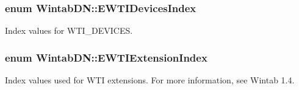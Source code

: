 \hypertarget{namespace_wintab_d_n_a87e63128e31d86cb418e895f3d58565c}{
\subsubsection[{EWTIDevicesIndex}]{\setlength{\rightskip}{0pt plus 5cm}enum {\bf WintabDN::EWTIDevicesIndex}}}
\label{namespace_wintab_d_n_a87e63128e31d86cb418e895f3d58565c}


Index values for WTI\_\-DEVICES. 

\hypertarget{namespace_wintab_d_n_a52875c234488913934e0d49ac13c438d}{
\subsubsection[{EWTIExtensionIndex}]{\setlength{\rightskip}{0pt plus 5cm}enum {\bf WintabDN::EWTIExtensionIndex}}}
\label{namespace_wintab_d_n_a52875c234488913934e0d49ac13c438d}


Index values used for WTI extensions. For more information, see Wintab 1.4. 


